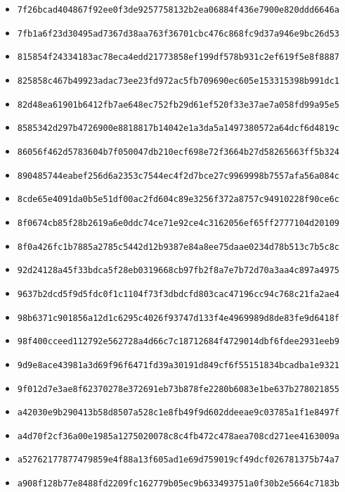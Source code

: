 {\begin{itemize}
    \item \texttt{7f26bcad404867f92ee0f3de9257758132b2ea06884f436e7900e820ddd6646a}
    \item \texttt{7fb1a6f23d30495ad7367d38aa763f36701cbc476c868fc9d37a946e9bc26d53}
    \item \texttt{815854f24334183ac78eca4edd21773858ef199df578b931c2ef619f5e8f8887}
    \item \texttt{825858c467b49923adac73ee23fd972ac5fb709690ec605e153315398b991dc1}
    \item \texttt{82d48ea61901b6412fb7ae648ec752fb29d61ef520f33e37ae7a058fd99a95e5}
    \item \texttt{8585342d297b4726900e8818817b14042e1a3da5a1497380572a64dcf6d4819c}
    \item \texttt{86056f462d5783604b7f050047db210ecf698e72f3664b27d58265663ff5b324}
    \item \texttt{890485744eabef256d6a2353c7544ec4f2d7bce27c9969998b7557afa56a084c}
    \item \texttt{8cde65e4091da0b5e51df00ac2fd604c89e3256f372a8757c94910228f90ce6c}
    \item \texttt{8f0674cb85f28b2619a6e0ddc74ce71e92ce4c3162056ef65ff2777104d20109}
    \item \texttt{8f0a426fc1b7885a2785c5442d12b9387e84a8ee75daae0234d78b513c7b5c8c}
    \item \texttt{92d24128a45f33bdca5f28eb0319668cb97fb2f8a7e7b72d70a3aa4c897a4975}
    \item \texttt{9637b2dcd5f9d5fdc0f1c1104f73f3dbdcfd803cac47196cc94c768c21fa2ae4}
    \item \texttt{98b6371c901856a12d1c6295c4026f93747d133f4e4969989d8de83fe9d6418f}
    \item \texttt{98f400cceed112792e562728a4d66c7c18712684f4729014dbf6fdee2931eeb9}
    \item \texttt{9d9e8ace43981a3d69f96f6471fd39a30191d849cf6f55151834bcadba1e9321}
    \item \texttt{9f012d7e3ae8f62370278e372691eb73b878fe2280b6083e1be637b278021855}
    \item \texttt{a42030e9b290413b58d8507a528c1e8fb49f9d602ddeeae9c03785a1f1e8497f}
    \item \texttt{a4d70f2cf36a00e1985a1275020078c8c4fb472c478aea708cd271ee4163009a}
    \item \texttt{a52762177877479859e4f88a13f605ad1e69d759019cf49dcf026781375b74a7}
    \item \texttt{a908f128b77e8488fd2209fc162779b05ec9b633493751a0f30b2e5664c7183b}

\end{itemize}}
